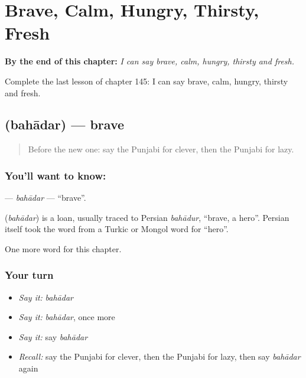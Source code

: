 
\chapter{Brave, Calm, Hungry, Thirsty, Fresh}
\label{ch:pa-brave-calm-hungry-thirsty-fresh}

\begin{chapteropening}
\textbf{By the end of this chapter:} \emph{I can say brave, calm, hungry, thirsty and fresh.}

Complete the last lesson of chapter 145: I can say brave, calm, hungry, thirsty and fresh.
\end{chapteropening}

\section[\texorpdfstring{\pa{ਬਹਾਦਰ} (bahādar)}{ਬਹਾਦਰ (bahādar)}]{ (bahādar) — brave}

\label{lesson:PA-C145-bahadar}



\begin{quote}
Before the new one: say the Punjabi for clever, then the Punjabi for lazy.
\end{quote}

\subsection*{You'll want to know: }
\textbf{} — \emph{bahādar} — \textquotedblleft{}brave\textquotedblright{}.

\begin{cousinweb}
\textbf{} (\emph{bahādar}) is a loan, usually traced to Persian \emph{bahādur}, \textquotedblleft{}brave, a hero\textquotedblright{}. Persian itself took the word from a Turkic or Mongol word for \textquotedblleft{}hero\textquotedblright{}.
\end{cousinweb}

\begin{grammarlens}[title={What you've built}]
One more word for this chapter.
\end{grammarlens}

\subsection*{Your turn}
\begin{itemize}
\raggedright
  \item \emph{Say it:} \emph{bahādar}
  \item \emph{Say it:} \emph{bahādar}, once more
  \item \emph{Say it:} say \emph{bahādar}
  \item \emph{Recall:} say the Punjabi for clever, then the Punjabi for lazy, then say \emph{bahādar} again
\end{itemize}

